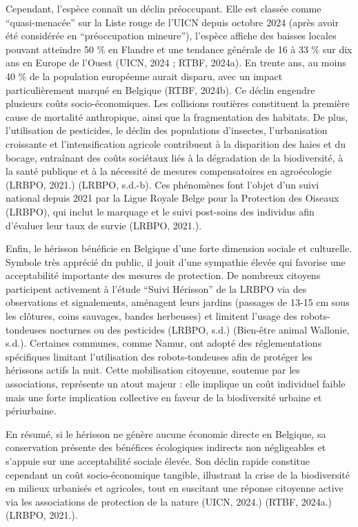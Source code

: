 \documentclass[a4paper,11pt]{article}
\begin{document}
Cependant, l’espèce connaît un déclin préoccupant. Elle est classée comme \enquote{quasi-menacée} sur la Liste rouge de l’UICN depuis octobre 2024 (après avoir été considérée en \enquote{préoccupation mineure}), l’espèce affiche des baisses locales pouvant atteindre 50 \% en Flandre et une tendance générale de 16 à 33 \% sur dix ans en Europe de l’Ouest (UICN, 2024 ; RTBF, 2024a). En trente ans, au moins 40 \% de la population européenne aurait disparu, avec un impact particulièrement marqué en Belgique (RTBF, 2024b). Ce déclin engendre plusieurs coûts socio-économiques. Les collisions routières constituent la première cause de mortalité anthropique, ainsi que la fragmentation des habitats. De plus, l’utilisation de pesticides, le déclin des populations d’insectes, l’urbanisation croissante et l’intensification agricole contribuent à la disparition des haies et du bocage, entraînant des coûts sociétaux liés à la dégradation de la biodiversité, à la santé publique et à la nécessité de mesures compensatoires en agroécologie (LRBPO, 2021.) (LRBPO, s.d.-b). Ces phénomènes font l’objet d’un suivi national depuis 2021 par la Ligue Royale Belge pour la Protection des Oiseaux (LRBPO), qui inclut le marquage et le suivi post-soins des individus afin d’évaluer leur taux de survie (LRBPO, 2021.).

Enfin, le hérisson bénéficie en Belgique d’une forte dimension sociale et culturelle. Symbole très apprécié du public, il jouit d’une sympathie élevée qui favorise une acceptabilité importante des mesures de protection. De nombreux citoyens participent activement à l’étude \enquote{Suivi Hérisson} de la LRBPO via des observations et signalements, aménagent leurs jardins (passages de 13-15 cm sous les clôtures, coins sauvages, bandes herbeuses) et limitent l’usage des robots-tondeuses nocturnes ou des pesticides (LRBPO, s.d.) (Bien-être animal Wallonie, s.d.). Certaines communes, comme Namur, ont adopté des réglementations spécifiques limitant l’utilisation des robots-tondeuses afin de protéger les hérissons actifs la nuit. Cette mobilisation citoyenne, soutenue par les associations, représente un atout majeur : elle implique un coût individuel faible mais une forte implication collective en faveur de la biodiversité urbaine et périurbaine.

En résumé, si le hérisson ne génère aucune économie directe en Belgique, sa conservation présente des bénéfices écologiques indirects non négligeables et s’appuie sur une acceptabilité sociale élevée. Son déclin rapide constitue cependant un coût socio-économique tangible, illustrant la crise de la biodiversité en milieux urbanisés et agricoles, tout en suscitant une réponse citoyenne active via les associations de protection de la nature (UICN, 2024.) (RTBF, 2024a.) (LRBPO, 2021.).
\end{document}

